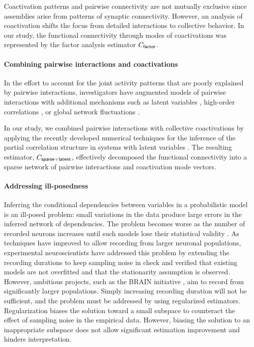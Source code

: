 \documentclass[10pt]{article}
\begin{document}
Coactivation patterns and pairwise connectivity are not mutually exclusive since assemblies arise from patterns of synaptic connectivity.  However, an analysis of coactivation shifts the focus from detailed interactions to  collective behavior.  
In our study, the functional connectivity through modes of coactivations was represented by the factor analysis estimator $C_{\sf factor}$.  

\paragraph{Combining pairwise interactions and coactivations}
In the effort to account for the joint activity patterns that are poorly explained by pairwise interactions, investigators have augmented models of pairwise interactions with additional mechanisms such as latent variables \cite{Koster:2013},  high-order correlations \cite{Ganmor:2011}, or global network fluctuations \cite{Tkacik:2013}.

In our study, we combined pairwise interactions with collective coactivations by applying the recently developed numerical techniques for the inference of the partial correlation structure in systems with latent variables \cite{Chandrasekaran:2010, Ma:2013}.  The resulting estimator, $C_{\sf sparse+latent}$, effectively decomposed the functional connectivity into a sparse network of pairwise interactions and coactivation mode vectors.

\paragraph{Addressing ill-posedness}
Inferring the conditional dependencies between variables in a probabilistic model is an ill-posed problem: small variations in the data produce large errors in the inferred network of dependencies. The problem becomes worse as the number of  recorded neurons increases until such models lose their statistical validity \cite{Roudi:2009}.  As techniques have improved to allow recording from larger neuronal populations, experimental neuroscientists have addressed this problem by extending the recording durations to keep sampling noise in check and verified that existing models are not overfitted and that the stationarity assumption is observed\cite{Tkacik:2013}. However, ambitious projects, such as the BRAIN initiative  \cite{Alivisatos:2013}, aim to record from significantly larger populations. Simply increasing recording duration will not be sufficient, and the problem must be addressed by using regularized estimators. Regularization biases the solution toward a small subspace to counteract the effect of  sampling noise in the empirical data. However, biasing the solution to an inappropriate subspace does not allow significant estimation improvement and hinders interpretation.
\end{document}
